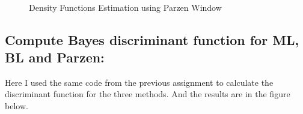 \documentclass[11pt, oneside]{article}   	%
\begin{document}
\begin{figure}
\begin{center}
	\\
\end{center}
\caption{Density Functions Estimation using Parzen Window}
\end{figure}



\subsection{Compute Bayes discriminant function for ML, BL and Parzen:}
Here I used the same code from the previous assignment to calculate the discriminant function for the three methods. And the results are in the figure below.
\end{document}
